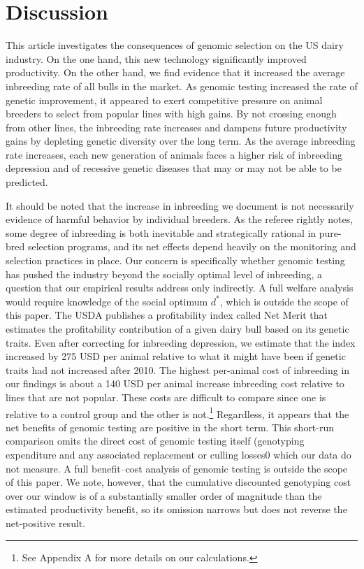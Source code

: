 \documentclass[12pt,letterpaper]{article}
\begin{document}
\section{Discussion\label{sec:discussion}}
This article investigates the consequences of genomic selection on the US dairy industry. On the one hand, this new technology significantly improved productivity. 
On the other hand, we find evidence that it increased the average inbreeding rate of all bulls in the market. As genomic testing increased the rate of genetic improvement, it appeared to exert competitive pressure on animal breeders to select from popular lines with high gains.
By not crossing enough from other lines, the inbreeding rate increases and dampens future productivity gains by depleting genetic diversity over the long term.
As the average inbreeding rate increases, each new generation of animals faces a higher risk of inbreeding depression and of recessive genetic diseases that may or may not be able to be predicted.

It should be noted that the increase in inbreeding we document is not necessarily evidence of harmful behavior by individual breeders. As the referee rightly notes, some degree of inbreeding is both inevitable and strategically rational in pure-bred selection programs, and its net effects depend heavily on the monitoring and selection practices in place. Our concern is specifically whether genomic testing has pushed the industry beyond the socially optimal level of inbreeding, a question that our empirical results address only indirectly. A full welfare analysis would require knowledge of the social optimum $d^{*}$, which is outside the scope of this paper.
The USDA publishes a profitability index called Net Merit that estimates the profitability contribution of a given dairy bull based on its genetic traits.
Even after correcting for inbreeding depression, we estimate that the index increased by 275 USD per animal relative to what it might have been if genetic traits had not increased after 2010.
The highest per-animal cost of inbreeding in our findings is about a 140 USD per animal increase inbreeding cost relative to lines that are not popular. These costs are difficult to compare since one is relative to a control group and the other is not.\footnote{See Appendix A for more details on our calculations.}
Regardless, it appears that the net benefits of genomic testing are positive in the short term.
This short-run comparison omits the direct cost of genomic testing itself (genotyping expenditure and any associated replacement or culling losses0 which our data do not measure. A full benefit--cost analysis of genomic testing is outside the scope of this paper. We note, however, that the cumulative discounted genotyping cost over our window is of a substantially smaller order of magnitude than the estimated productivity benefit, so its omission narrows but does not reverse the net-positive result. %
\end{document}
